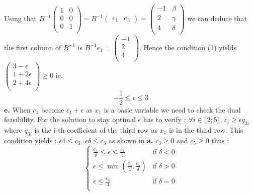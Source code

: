 \documentclass{article}
\begin{document}
Using that $B^{-1}\left(\begin{array}{cc}1& 0 \\0& 0 \\0&1 \\\end{array}\right) = B^{-1}\left(\begin{array}{cc}e_1 & e_3\end{array}\right) = \left(\begin{array}{cc}-1&\beta\\ 2&\gamma \\ 4&\delta \\\end{array}\right)$ we can deduce that the first column of $B^{-1}$ is $B^{-1}e_1 = \left(\begin{array}{c} -1 \\ 2 \\ 4 \\\end{array}\right)$. Hence the condition (1) yields $\left(\begin{array}{c}
    3-\epsilon\\
    1+2\epsilon\\
    2+4\epsilon\\
\end{array}\right)\ge 0$ ie.
 $$\boxed{-\dfrac{1}{2}\leq \epsilon\leq 3}$$
\textbf{e.} When $c_1$ become $c_1+\epsilon$ as $x_1$ is a basic variable we need to check the dual feasibility. For the solution to stay optimal $\epsilon$ has to verify : $\forall i\in\llbracket 2;5\rrbracket$, $ c_i\ge \epsilon q_{3i}$ where $q_{3i}$ is the i-th coefficient of the third row as $x_1$ is in the third row. This condition yields : $\epsilon 4 \leq \overline{c_3 }$, $\epsilon \delta \leq \overline{c_3}$ as shown in \textbf{a.} $\overline{c_3}\ge 0$ and $\overline{c_5}\ge 0$ thus : 
$$\boxed{\left\{\begin{array}{lc}
    \frac{\overline{c_5}}{\delta}\leq \epsilon \leq \frac{\overline{c_3}}{4} & \text{if }\delta<0\\
    \epsilon \leq \min(\frac{\overline{c_3}}{4},\frac{\overline{c_5}}{\delta})& \text{if } \delta>0\\
    \epsilon \leq \frac{\overline{c_3}}{4} & \text{if }\delta = 0\\
\end{array}\right.}$$
\end{document}
